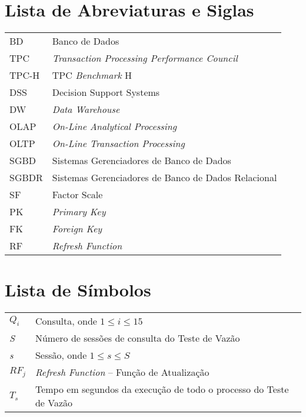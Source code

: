 
\pagebreak
{}
\listoffigures

\pagebreak
{}
\listoftables

\pagebreak
{}
\chapter*{Lista de Abreviaturas e Siglas}
\begin{tabular}{ll}
	BD & Banco de Dados\\
	TPC & \textit{Transaction Processing Performance Council}\\
	TPC-H & TPC \textit{Benchmark} H\\
	DSS & Decision Support Systems\\
	DW & \textit{Data Warehouse}\\
	OLAP & \textit{On-Line Analytical Processing}\\
	OLTP & \textit{On-Line Transaction Processing}\\
	SGBD & Sistemas Gerenciadores de Banco de Dados\\
	SGBDR & Sistemas Gerenciadores de Banco de Dados Relacional\\
	SF & Factor Scale\\
	PK & \textit{Primary Key}\\
	FK & \textit{Foreign Key}\\
	RF & \textit{Refresh Function} \\
\end{tabular}

\pagebreak
{}
\chapter*{Lista de Símbolos}
\begin{tabular}{ll}
	$Q_{i}$ & Consulta, onde \mbox{$1 \le i \le 15$}\\
	\textit{S} & Número de sessões de consulta do Teste de Vazão\\
	\textit{s} & Sessão, onde \mbox{$1 \le s \le S$}\\
	$RF_{j}$ & \textit{Refresh Function} -- Função de Atualização\\
	$T_{s}$ & Tempo em segundos da execução de todo o processo do Teste de Vazão\\
\end{tabular}

\pagebreak
{}
\tableofcontents
